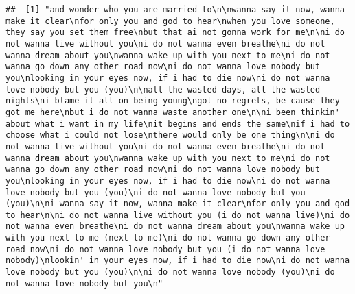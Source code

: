 \documentclass[]{article}
\newenvironment{Shaded}{\begin{snugshade}}{\end{snugshade}}
\newcommand{\NormalTok}[1]{#1}
\newcommand{\OperatorTok}[1]{\textcolor[rgb]{0.81,0.36,0.00}{\textbf{#1}}}
\begin{document}
\begin{Shaded}
\end{Shaded}

\begin{verbatim}
##  [1] "and wonder who you are married to\n\nwanna say it now, wanna make it clear\nfor only you and god to hear\nwhen you love someone, they say you set them free\nbut that ai not gonna work for me\n\ni do not wanna live without you\ni do not wanna even breathe\ni do not wanna dream about you\nwanna wake up with you next to me\ni do not wanna go down any other road now\ni do not wanna love nobody but you\nlooking in your eyes now, if i had to die now\ni do not wanna love nobody but you (you)\n\nall the wasted days, all the wasted nights\ni blame it all on being young\ngot no regrets, be cause they got me here\nbut i do not wanna waste another one\n\ni been thinkin' about what i want in my life\nit begins and ends the same\nif i had to choose what i could not lose\nthere would only be one thing\n\ni do not wanna live without you\ni do not wanna even breathe\ni do not wanna dream about you\nwanna wake up with you next to me\ni do not wanna go down any other road now\ni do not wanna love nobody but you\nlooking in your eyes now, if i had to die now\ni do not wanna love nobody but you (you)\ni do not wanna love nobody but you (you)\n\ni wanna say it now, wanna make it clear\nfor only you and god to hear\n\ni do not wanna live without you (i do not wanna live)\ni do not wanna even breathe\ni do not wanna dream about you\nwanna wake up with you next to me (next to me)\ni do not wanna go down any other road now\ni do not wanna love nobody but you (i do not wanna love nobody)\nlookin' in your eyes now, if i had to die now\ni do not wanna love nobody but you (you)\n\ni do not wanna love nobody (you)\ni do not wanna love nobody but you\n"                                                                                                                                                                                                                                                                                                                                                                                                                                                                                                                                                                                                                                                                                                                                                                                                                                                                                                                                                                                                                                                                                                                                                                                                                                                                 

\end{verbatim}
\end{document}
